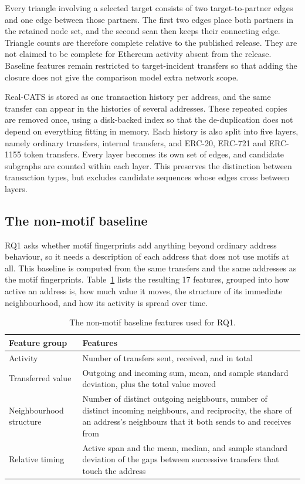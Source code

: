 Every triangle involving a selected target consists of two target-to-partner
edges and one edge between those partners. The first two edges place both
partners in the retained node set, and the second scan then keeps their connecting
edge. Triangle counts are therefore complete relative to the published release.
They are not claimed to be complete for Ethereum activity absent from the
release. Baseline features remain restricted to target-incident transfers so
that adding the closure does not give the comparison model extra network scope.

Real-CATS is stored as one transaction history per address, and the same
transfer can appear in the histories of several addresses. These repeated copies
are removed once, using a disk-backed index so that the de-duplication does not
depend on everything fitting in memory. Each history is also split into five
layers, namely ordinary transfers, internal transfers, and ERC-20, ERC-721 and
ERC-1155 token transfers. Every layer becomes its own set of edges, and candidate subgraphs
are counted within each layer. This preserves the distinction between transaction
types, but excludes candidate sequences whose edges cross between layers.

\subsection{The non-motif baseline}

RQ1 asks whether motif fingerprints add anything beyond ordinary address behaviour, so it
needs a description of each address that does not use motifs at all. This
baseline is computed from the same transfers and the same addresses as the motif
fingerprints. Table~\ref{tab:results_baseline_features} lists the resulting 17
features, grouped into how active an address is, how much value it moves, the
structure of its immediate neighbourhood, and how its activity is spread over
time.

\begin{table}[ht]
\centering
\caption{The non-motif baseline features used for RQ1.}
\label{tab:results_baseline_features}
\small
\begin{tabular}{@{}p{3.4cm} p{9.5cm}@{}}
\toprule
\textbf{Feature group} & \textbf{Features} \\
\midrule
Activity &
Number of transfers sent, received, and in total \\[2pt]
Transferred value &
Outgoing and incoming sum, mean, and sample standard deviation, plus the total
value moved \\[2pt]
Neighbourhood structure &
Number of distinct outgoing neighbours, number of distinct incoming neighbours,
and reciprocity, the share of an address's neighbours that it both sends to and
receives from \\[2pt]
Relative timing &
Active span and the mean, median, and sample standard deviation of the gaps
between successive transfers that touch the address \\
\bottomrule
\end{tabular}
\end{table}

